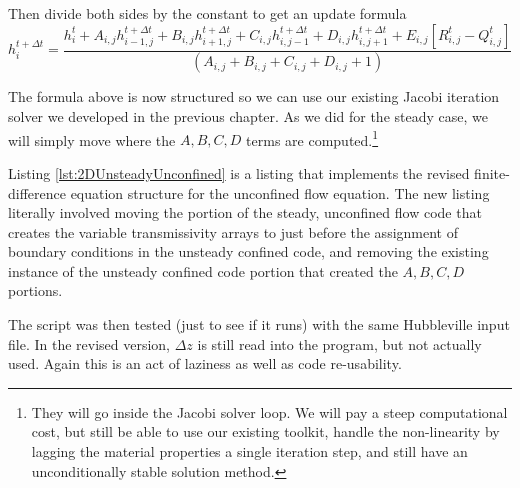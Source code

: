 Then divide both sides by the constant to get an update formula
\begin{equation}
h_i^{t+\Delta t} = 
\frac{h_i^{t} + A_{i,j}h_{i-1,j}^{t+ \Delta t} + B_{i,j}h_{i+1,j}^{t+ \Delta t} + C_{i,j}h_{i,j-1}^{t+ \Delta t} + D_{i,j}h_{i,j+1}^{t+ \Delta t} + E_{i,j}[R_{i,j}^{t}-Q_{i,j}^{t}] }{(A_{i,j}+B_{i,j}+C_{i,j}+D_{i,j}+1)} 
\end{equation}

The formula above is now structured so we can use our existing Jacobi iteration solver we developed in the previous chapter.
As we did for the steady case, we will simply move where the $A,B,C,D$ terms are computed.\footnote{They will go inside the Jacobi solver loop. We will pay a steep computational cost, but still be able to use our existing toolkit, handle the non-linearity by lagging the material properties a single iteration step, and still have an unconditionally stable solution method.}

Listing \ref{lst:2DUnsteadyUnconfined} is a listing that implements the revised finite-difference equation structure for the unconfined flow equation.
The new listing literally involved moving the portion of the steady, unconfined flow code that creates the variable transmissivity arrays to just before the assignment of boundary conditions in the unsteady confined code, and removing the existing instance of the unsteady confined code portion that created the $A,B,C,D$ portions.

The script was then tested (just to see if it runs) with the same Hubbleville input file.  
In the revised version, $\Delta z$ is still read into the program, but not actually used.  
Again this is an act of laziness as well as code re-usability.

